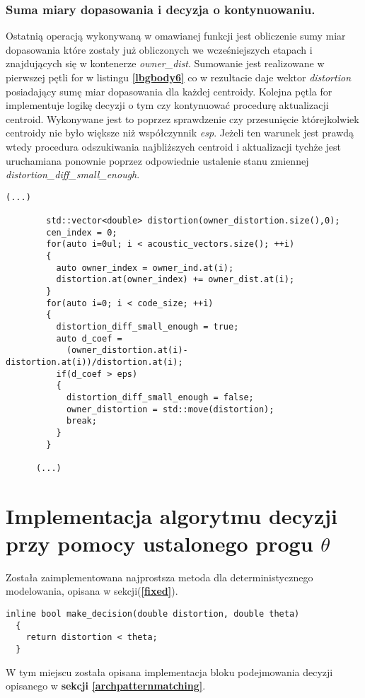 \subsubsection{Suma miary dopasowania i decyzja o kontynuowaniu.}
Ostatnią operacją wykonywaną w omawianej funkcji jest obliczenie sumy miar dopasowania które zostały już obliczonych we wcześniejszych etapach i znajdujących się w kontenerze \textit{owner\_dist}. Sumowanie jest realizowane w pierwszej pętli for w listingu \textbf{\ref{lbgbody6}} co w rezultacie daje wektor \textit{distortion} posiadający sumę miar dopasowania dla każdej centroidy. Kolejna pętla for implementuje logikę decyzji o tym czy kontynuować procedurę aktualizacji centroid. Wykonywane jest to poprzez sprawdzenie czy przesunięcie którejkolwiek centroidy nie było większe niż współczynnik \textit{esp}. Jeżeli ten warunek jest prawdą wtedy procedura odszukiwania najbliższych centroid i aktualizacji tychże jest uruchamiana ponownie poprzez odpowiednie ustalenie stanu zmiennej \textit{distortion\_diff\_small\_enough}.
\begin{lstlisting}[style=lst:cpp, caption=Funkcja \textit{lbg}\label{lst:lbgbody6} - decyzja o kontynuowaniu]
      (...)

        std::vector<double> distortion(owner_distortion.size(),0);
        cen_index = 0;
        for(auto i=0ul; i < acoustic_vectors.size(); ++i)
        {
          auto owner_index = owner_ind.at(i);
          distortion.at(owner_index) += owner_dist.at(i);
        }
        for(auto i=0; i < code_size; ++i)
        {
          distortion_diff_small_enough = true;
          auto d_coef =
            (owner_distortion.at(i)-distortion.at(i))/distortion.at(i); 
          if(d_coef > eps)
          {
            distortion_diff_small_enough = false;
            owner_distortion = std::move(distortion);
            break;
          }
        }

      (...)
\end{lstlisting}

\section{Implementacja algorytmu decyzji przy pomocy ustalonego progu $\theta$}

Została zaimplementowana najprostsza metoda dla deterministycznego modelowania, opisana w sekcji(\textbf{\ref{fixed}}).

\begin{lstlisting}[style=lst:cpp, caption=Funkcja \textit{make\_decision}\label{lst:dec} - decyzja o kontynuowaniu]
  inline bool make_decision(double distortion, double theta)
  {
    return distortion < theta;
  }

\end{lstlisting}

W tym miejscu została opisana implementacja bloku podejmowania decyzji opisanego w \textbf{sekcji \ref{archpatternmatching}}.

